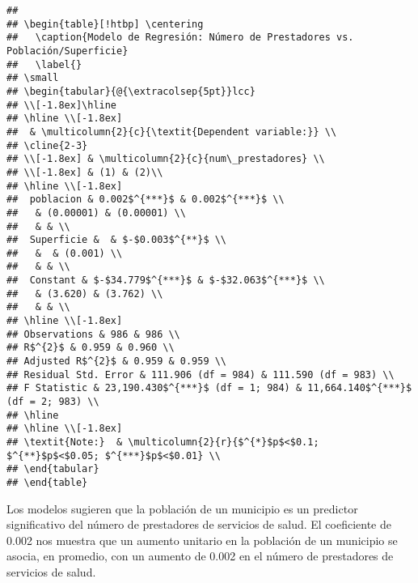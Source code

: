 \documentclass[
]{article}
\begin{document}
\begin{verbatim}
## 
## \begin{table}[!htbp] \centering 
##   \caption{Modelo de Regresión: Número de Prestadores vs. Población/Superficie} 
##   \label{} 
## \small 
## \begin{tabular}{@{\extracolsep{5pt}}lcc} 
## \\[-1.8ex]\hline 
## \hline \\[-1.8ex] 
##  & \multicolumn{2}{c}{\textit{Dependent variable:}} \\ 
## \cline{2-3} 
## \\[-1.8ex] & \multicolumn{2}{c}{num\_prestadores} \\ 
## \\[-1.8ex] & (1) & (2)\\ 
## \hline \\[-1.8ex] 
##  poblacion & 0.002$^{***}$ & 0.002$^{***}$ \\ 
##   & (0.00001) & (0.00001) \\ 
##   & & \\ 
##  Superficie &  & $-$0.003$^{**}$ \\ 
##   &  & (0.001) \\ 
##   & & \\ 
##  Constant & $-$34.779$^{***}$ & $-$32.063$^{***}$ \\ 
##   & (3.620) & (3.762) \\ 
##   & & \\ 
## \hline \\[-1.8ex] 
## Observations & 986 & 986 \\ 
## R$^{2}$ & 0.959 & 0.960 \\ 
## Adjusted R$^{2}$ & 0.959 & 0.959 \\ 
## Residual Std. Error & 111.906 (df = 984) & 111.590 (df = 983) \\ 
## F Statistic & 23,190.430$^{***}$ (df = 1; 984) & 11,664.140$^{***}$ (df = 2; 983) \\ 
## \hline 
## \hline \\[-1.8ex] 
## \textit{Note:}  & \multicolumn{2}{r}{$^{*}$p$<$0.1; $^{**}$p$<$0.05; $^{***}$p$<$0.01} \\ 
## \end{tabular} 
## \end{table}
\end{verbatim}

Los modelos sugieren que la población de un municipio es un predictor
significativo del número de prestadores de servicios de salud. El
coeficiente de 0.002 nos muestra que un aumento unitario en la población
de un municipio se asocia, en promedio, con un aumento de 0.002 en el
número de prestadores de servicios de salud.
\end{document}
